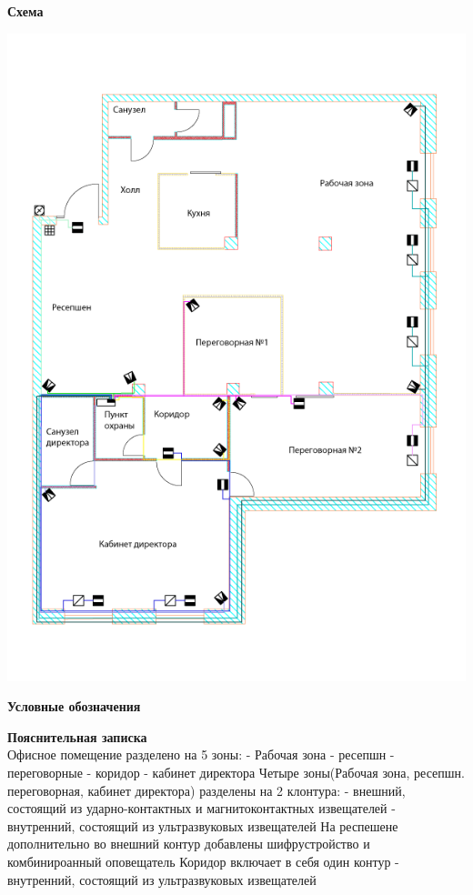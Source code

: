 \documentclass[a4paper,14pt]{extarticle}
\begin{document}
    \begin{center}
        \textbf{Схема}
    \end{center}
    \vspace{-6ex}
    \begin{center}
        \includegraphics[scale=0.65, angle=90]{pics/Sensors.png}
    \end{center}
    \textbf{Условные обозначения}
    \begin{center}
        
    \end{center}
    \textbf{Пояснительная записка}\\
    Офисное помещение разделено на 5 зоны:
    - Рабочая зона
    - ресепшн 
    - переговорные 
    - коридор
    - кабинет директора
    Четыре зоны(Рабочая зона, ресепшн. переговорная, кабинет директора) разделены на 2 клонтура:
    - внешний, состоящий из ударно-контактных и магнитоконтактных извещателей
    - внутренний, состоящий из ультразвуковых извещателей 
    На респешене дополнительно во внешний контур добавлены шифрустройство и комбинироанный оповещатель
    Коридор включает в себя один контур - внутренний, состоящий из ультразвуковых извещателей
    
\end{document}
